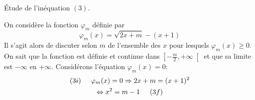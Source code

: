 \begin{center}
\'Etude de l'inéquation $(3)$.  
\end{center}
On considère la fonction $\varphi_m$ définie par
\begin{displaymath}
 \varphi_m(x) = \sqrt{2x+m} - (x+1)
\end{displaymath}
Il s'agit alors de discuter selon $m$ de l'ensemble des $x$ pour lesquels $\varphi_m(x)\geq 0$.\newline
On sait que la fonction est définie et continue dans $\left[ -\frac{m}{2},+\infty\right[$ et  que sa limite est $-\infty$ en $+\infty$.\newline
Considérons l'équation $\varphi_m(x)= 0$:
\begin{multline*}
 (3i)\hspace{0.5cm} \varphi_m(x)= 0 \Rightarrow 2x+m = (x+1)^2 \\
 \Leftrightarrow x^2 = m-1 \hspace{0.5cm} (3f)
\end{multline*}

